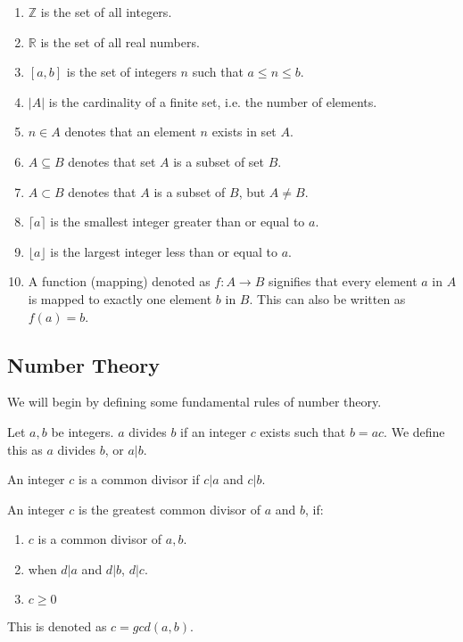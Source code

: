 \begin{enumerate}
	\item $\mathbb{Z}$ is the set of all integers.
	\item $\mathbb{R}$ is the set of all real numbers.
	\item $[a,b]$ is the set of integers $n$ such that $a\le n \le b$.
	\item $|A|$ is the cardinality of a finite set, i.e. the number of elements.
	\item $n \in A$ denotes that an element $n$ exists in set $A$.
	\item $A \subseteq B$ denotes that set $A$ is a subset of set $B$.
	\item $A \subset B$ denotes that $A$ is a subset of $B$, but $A \neq B$.
	\item $\lceil a \rceil$ is the smallest integer greater than or equal to $a$.
	\item $\lfloor a \rfloor$ is the largest integer less than or equal to $a$.
	\item A function (mapping) denoted as $f : A \rightarrow B$ signifies that every element $a$ in $A$ is mapped to exactly one element $b$ in $B$. This can also be written as $f(a) = b$.
\end{enumerate}

\subsection{Number Theory}

We will begin by defining some fundamental rules of number theory. 

\begin{mathdef}
	Let $a,b$ be integers. $a$ divides $b$ if an integer $c$ exists such that $b = ac$. We define this as $a$ divides $b$, or $a|b$.
\end{mathdef}

\begin{mathdef}
	An integer $c$ is a common divisor if $c|a$ and $c|b$.
\end{mathdef}

\begin{mathdef}
	An integer $c$ is the greatest common divisor of $a$ and $b$, if:
	\begin{enumerate}
		\item $c$ is a common divisor of $a,b$.
		\item when $d|a$ and $d|b$, $d|c$.
		\item $c\ge0$
	\end{enumerate}
	This is denoted as $c = gcd(a,b)$.
\end{mathdef}

